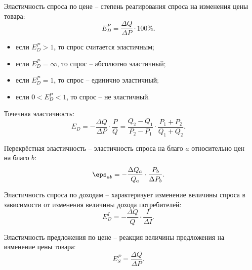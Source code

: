Эластичность спроса по цене -- степень реагирования спроса на изменения цены
товара:
\[
    E^P_D = \frac{\Delta Q}{\Delta P}\cdot100\%.
\]

\begin{itemize}
    \item если \( E^P_D > 1 \), то спрос считается эластичным;
    \item если \( E^P_D = \infty \), то спрос -- абсолютно эластичный;
    \item если \( E^P_D = 1 \), то спрос -- единично эластичный;
    \item если \( 0 < E^P_D < 1 \), то спрос -- не эластичный.
\end{itemize}

Точечная эластичность:
\[
    E_D = -\frac{\Delta Q}{\Delta P}\cdot\frac{P}{Q} =
    \frac{Q_2 - Q_1}{P_2 - P_1}\cdot\frac{P_1 + P_2}{Q_1 + Q_2}.
\]

Перекрёстная эластичность -- эластичность спроса на благо \( a \) относительно
цен на благо \( b \):
\[
    \eps_{ab} = -\frac{\Delta Q_a}{Q_a}\cdot\frac{P_b}{\Delta P_b}.
\]

Эластичность спроса по доходам -- характеризует изменение величины спроса в
зависимости от изменения величины дохода потребителей:
\[
    E_D^I = -\frac{\Delta Q}{Q}\cdot\frac{I}{\Delta I}.
\]

Эластичность предложения по цене -- реакция величины предложения на изменение
цены товара:
\[
    E_S^P = \frac{\Delta Q}{\Delta P}.
\]
